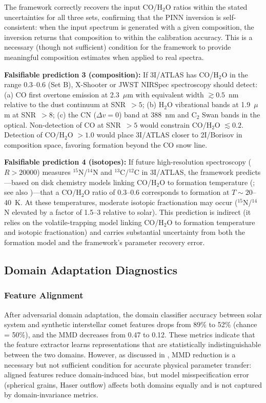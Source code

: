 \documentclass[usenatbib]{mnras}
\begin{document}
The framework correctly recovers the input CO/H$_2$O ratios within the stated uncertainties for all three sets, confirming that the PINN inversion is self-consistent: when the input spectrum is generated with a given composition, the inversion returns that composition to within the calibration accuracy. This is a necessary (though not sufficient) condition for the framework to provide meaningful composition estimates when applied to real spectra.

\textbf{Falsifiable prediction 3 (composition):} If 3I/ATLAS has CO/H$_2$O in the range 0.3--0.6 (Set B), X-Shooter or JWST NIRSpec spectroscopy should detect: (a) CO first overtone emission at 2.3~$\mu$m with equivalent width $\gtrsim 0.5$~nm relative to the dust continuum at SNR~$>5$; (b) H$_2$O vibrational bands at 1.9~$\mu$m at SNR~$>8$; (c) the CN ($\Delta v = 0$) band at 388~nm and C$_2$ Swan bands in the optical. Non-detection of CO at SNR~$>5$ would constrain CO/H$_2$O $\lesssim 0.2$. Detection of CO/H$_2$O $> 1.0$ would place 3I/ATLAS closer to 2I/Borisov in composition space, favoring formation beyond the CO snow line.

\textbf{Falsifiable prediction 4 (isotopes):} If future high-resolution spectroscopy ($R > 20000$) measures $^{15}$N/$^{14}$N and $^{13}$C/$^{12}$C in 3I/ATLAS, the framework predicts---based on disk chemistry models linking CO/H$_2$O to formation temperature (\citealt{oberg11}; see also \citealt{biver16})---that a CO/H$_2$O ratio of 0.3--0.6 corresponds to formation at $T \sim 20$--40~K. At these temperatures, moderate isotopic fractionation may occur ($^{15}$N/$^{14}$N elevated by a factor of 1.5--3 relative to solar). This prediction is indirect (it relies on the volatile-trapping model linking CO/H$_2$O to formation temperature and isotopic fractionation) and carries substantial uncertainty from both the formation model and the framework's parameter recovery error.

\subsection{Domain Adaptation Diagnostics}\label{sec:domain}

\subsubsection{Feature Alignment}

After adversarial domain adaptation, the domain classifier accuracy between solar system and synthetic interstellar comet features drops from 89\% to 52\% (chance = 50\%), and the MMD decreases from 0.47 to 0.12. These metrics indicate that the feature extractor learns representations that are statistically indistinguishable between the two domains. However, as discussed in \citet{paperI}, MMD reduction is a necessary but not sufficient condition for accurate physical parameter transfer: aligned features reduce domain-induced bias, but model misspecification error (spherical grains, Haser outflow) affects both domains equally and is not captured by domain-invariance metrics.
\end{document}
